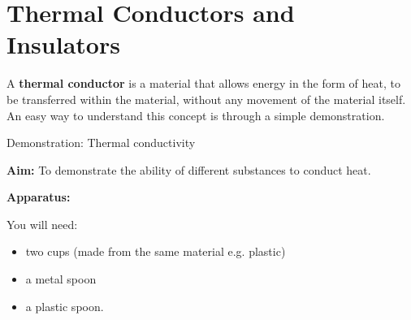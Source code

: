             \section{Thermal Conductors and Insulators}
            \nopagebreak
      \label{m38706*id66527}A \textbf{thermal conductor} is a material that allows energy in the form of heat, to be transferred within the material, without any movement of the material itself. An easy way to understand this concept is through a simple demonstration.\par 
{} 
\label{m38706*secfhsst!!!underscore!!!id453}
            \begin{g_experiment}{Demonstration: Thermal conductivity}{
            \nopagebreak
            \label{m38706*id66568}\noindent{}\textbf{Aim: }\newline
    To demonstrate the ability of different substances to conduct heat.\par 
      \label{m38706*id66588}\noindent{}\textbf{Apparatus: }\newline
\begin{minipage}{.5\textwidth}
You will need:
\begin{itemize}
 \item two cups (made from the same material e.g. plastic)
\item a metal spoon
\item a plastic spoon.
\end{itemize} 
\end{minipage}
\begin{minipage}{.5\textwidth}
	\begin{figure}[H] %
    \begin{center}
    \end{center}

\end{figure}
\end{minipage}}
\end{g_experiment}

